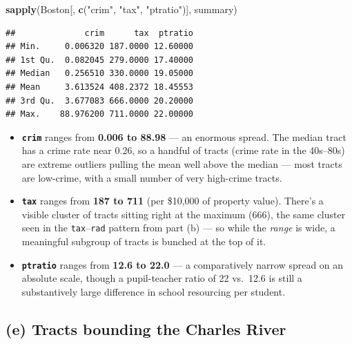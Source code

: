 \documentclass[
  11pt,
]{article}
\newenvironment{Shaded}{\begin{snugshade}}{\end{snugshade}}
\newcommand{\FunctionTok}[1]{\textcolor[rgb]{0.13,0.29,0.53}{\textbf{#1}}}
\newcommand{\NormalTok}[1]{#1}
\newcommand{\SpecialCharTok}[1]{\textcolor[rgb]{0.81,0.36,0.00}{\textbf{#1}}}
\newcommand{\StringTok}[1]{\textcolor[rgb]{0.31,0.60,0.02}{#1}}
\providecommand{\tightlist}{%
  \setlength{\itemsep}{0pt}\setlength{\parskip}{0pt}}
\begin{document}
\begin{Shaded}
\begin{Highlighting}[]
\FunctionTok{sapply}\NormalTok{(Boston[, }\FunctionTok{c}\NormalTok{(}\StringTok{"crim"}\NormalTok{, }\StringTok{"tax"}\NormalTok{, }\StringTok{"ptratio"}\NormalTok{)], summary)}
\end{Highlighting}
\end{Shaded}

\begin{verbatim}
##              crim      tax  ptratio
## Min.     0.006320 187.0000 12.60000
## 1st Qu.  0.082045 279.0000 17.40000
## Median   0.256510 330.0000 19.05000
## Mean     3.613524 408.2372 18.45553
## 3rd Qu.  3.677083 666.0000 20.20000
## Max.    88.976200 711.0000 22.00000
\end{verbatim}

\begin{itemize}
\tightlist
\item
  \textbf{\texttt{crim}} ranges from \textbf{0.006 to 88.98} --- an
  enormous spread. The median tract has a crime rate near 0.26, so a
  handful of tracts (crime rate in the 40s--80s) are extreme outliers
  pulling the mean well above the median --- most tracts are low-crime,
  with a small number of very high-crime tracts.
\item
  \textbf{\texttt{tax}} ranges from \textbf{187 to 711} (per \$10,000 of
  property value). There's a visible cluster of tracts sitting right at
  the maximum (666), the same cluster seen in the
  \texttt{tax}--\texttt{rad} pattern from part (b) --- so while the
  \emph{range} is wide, a meaningful subgroup of tracts is bunched at
  the top of it.
\item
  \textbf{\texttt{ptratio}} ranges from \textbf{12.6 to 22.0} --- a
  comparatively narrow spread on an absolute scale, though a
  pupil-teacher ratio of 22 vs.~12.6 is still a substantively large
  difference in school resourcing per student.
\end{itemize}

\subsection{(e) Tracts bounding the Charles
River}\label{e-tracts-bounding-the-charles-river}

\begin{Shaded}
\end{Shaded}
\end{document}
